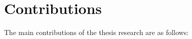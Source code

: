 





\section{Contributions}\label{contributions_1}
The main contributions of the thesis research are as follows: \\


